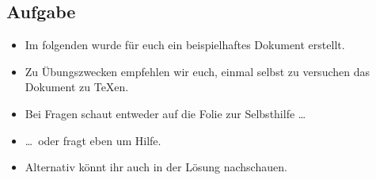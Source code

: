 \subsection{Aufgabe}

\begin{frame}{\subsecname}
    \begin{itemize}
        \item Im folgenden wurde für euch ein beispielhaftes Dokument erstellt.
        \item Zu Übungszwecken empfehlen wir euch, einmal selbst zu versuchen das Dokument zu
            \TeX{}en.
        \medskip
        \item Bei Fragen schaut entweder auf die Folie zur Selbsthilfe \dots
        \item \dots~oder fragt eben um Hilfe.
        \item Alternativ könnt ihr auch in der Lösung nachschauen.
    \end{itemize}
\end{frame}
